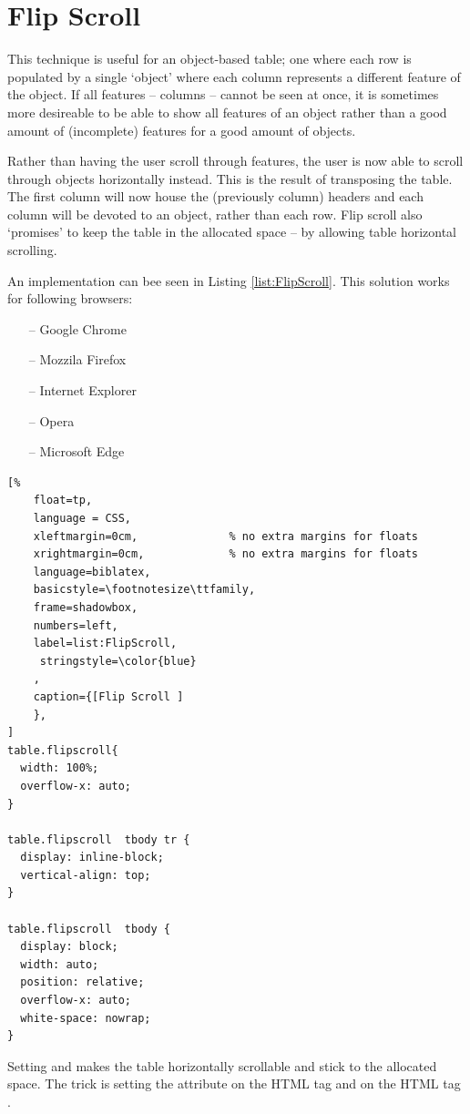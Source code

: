  
\section{Flip Scroll}
This technique is useful for an object-based table; one where each row
is populated by a single `object' where each column represents a
different feature of the object. If all features -- columns -- cannot
be seen at once, it is sometimes more desireable to be able to show
all features of an object rather than a good amount of (incomplete)
features for a good amount of objects.
\newline

Rather than having the user scroll through features, the user is now
able to scroll through objects horizontally instead. This is the
result of transposing the table. The first column will now house the
(previously column) headers and each column will be devoted to an
object, rather than each row. Flip scroll also `promises' to keep the 
table in the allocated space -- by allowing table horizontal scrolling.

An implementation can bee seen in Listing \ref{list:FlipScroll}. This 
solution works for following browsers:
\begin{itemize}
    \item[--] Google Chrome
    \item[--] Mozzila Firefox
    \item[--] Internet Explorer
    \item[--] Opera
    \item[--] Microsoft Edge
\end{itemize}

\begin{lstlisting}[%
    float=tp,
    language = CSS,
    xleftmargin=0cm,              % no extra margins for floats
    xrightmargin=0cm,             % no extra margins for floats
    language=biblatex,
    basicstyle=\footnotesize\ttfamily,
    frame=shadowbox,
    numbers=left,
    label=list:FlipScroll,
     stringstyle=\color{blue}
    ,
    caption={[Flip Scroll ]
    },
]
table.flipscroll{
  width: 100%;
  overflow-x: auto;
}
  
table.flipscroll  tbody tr { 
  display: inline-block; 
  vertical-align: top; 
}
  
table.flipscroll  tbody { 
  display: block; 
  width: auto; 
  position: relative; 
  overflow-x: auto; 
  white-space: nowrap; 
}
\end{lstlisting}

Setting  and  makes the
table horizontally scrollable and stick to the allocated space. The trick 
is setting the attribute  on the 
 HTML tag and  on the
 HTML tag \parencite{FS}.

